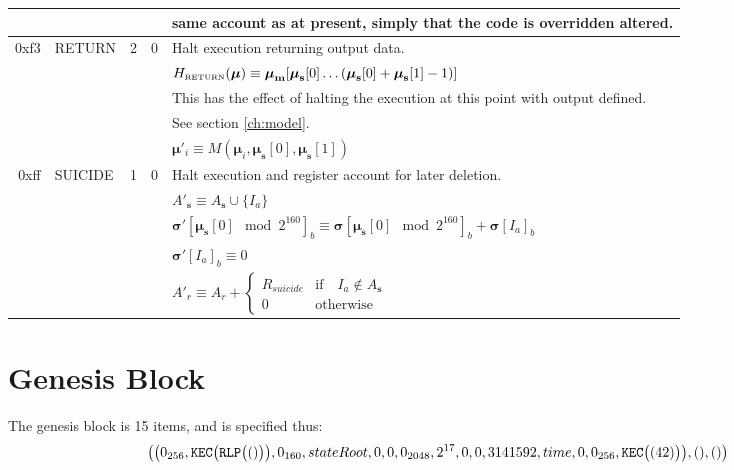 \documentclass[9pt,oneside]{amsart}
\begin{document}
\begin{tabular*}{\columnwidth}[h]{rlrrl}
&&&& same account as at present, simply that the code is overridden altered.\\
\midrule
0xf3 & {\small RETURN} & 2 & 0 & Halt execution returning output data. \\
&&&& $H_{\text{\tiny RETURN}}(\boldsymbol{\mu}) \equiv \boldsymbol{\mu}_\mathbf{m}[ \boldsymbol{\mu}_\mathbf{s}[0] \dots ( \boldsymbol{\mu}_\mathbf{s}[0] + \boldsymbol{\mu}_\mathbf{s}[1] - 1 ) ]$ \\
&&&& This has the effect of halting the execution at this point with output defined.\\
&&&& See section \ref{ch:model}. \\
&&&& $\boldsymbol{\mu}'_i \equiv M(\boldsymbol{\mu}_i, \boldsymbol{\mu}_\mathbf{s}[0], \boldsymbol{\mu}_\mathbf{s}[1])$ \\
\midrule
0xff & {\small SUICIDE} & 1 & 0 & Halt execution and register account for later deletion. \\
&&&& $A'_\mathbf{s} \equiv A_\mathbf{s} \cup \{ I_a \}$ \\
&&&& $\boldsymbol{\sigma}'[\boldsymbol{\mu}_\mathbf{s}[0] \mod 2^{160}]_b \equiv \boldsymbol{\sigma}[\boldsymbol{\mu}_\mathbf{s}[0] \mod 2^{160}]_b + \boldsymbol{\sigma}[I_a]_b$ \\
&&&& $\boldsymbol{\sigma}'[I_a]_b \equiv 0$ \\
&&&& $A'_{r} \equiv A_{r} + \begin{cases}
R_{suicide} & \text{if} \quad I_a \notin A_\mathbf{s} \\
0 & \text{otherwise}
\end{cases}$ \\\bottomrule
\end{tabular*}


\section{Genesis Block}\label{app:genesis}

The genesis block is 15 items, and is specified thus:
\begin{equation}
\big( \big( 0_{256}, \mathtt{\tiny KEC}\big(\mathtt{\tiny RLP}\big( () \big)\big), 0_{160}, stateRoot, 0, 0, 0_{2048}, 2^{17}, 0, 0, 3141592, time, 0, 0_{256},  \mathtt{\tiny KEC}\big( (42) \big) \big), (), () \big)
\end{equation}
\end{document}
